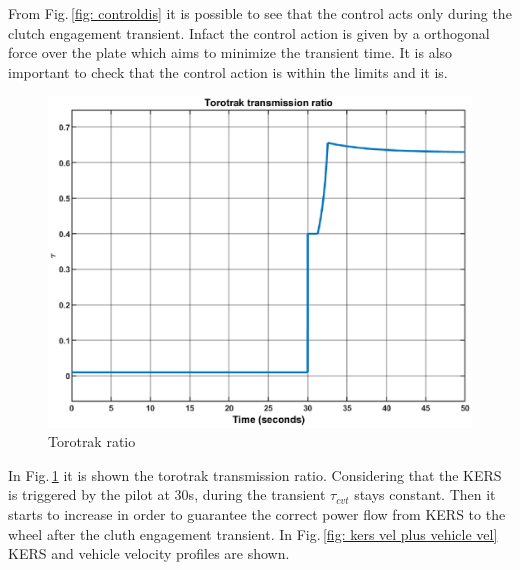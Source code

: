\documentclass[11pt]{article}
\begin{document}
From Fig.\,\ref{fig: controldis} it is possible to see that the control acts only during the clutch engagement transient. Infact the control action is given by a orthogonal force over the plate which aims to minimize the transient time. It is also important to check that the control action is within the limits and it is. 

\begin{figure}[H]
	\centering
	\includegraphics[width=.6\textwidth]{Images/Results_Dynamics/Discharge/Torotrak_ratio.eps}
	\caption{Torotrak ratio}
	\label{fig: tororatiodis}
\end{figure}

In Fig.\,\ref{fig: tororatiodis} it is shown the torotrak transmission ratio. Considering that the KERS is triggered by the pilot at $30$s, during the transient $\tau_{cvt}$ stays constant. Then it starts to increase in order to guarantee the correct power flow from KERS to the wheel after the cluth engagement transient. In Fig.\,\ref{fig: kers vel plus vehicle vel} KERS and vehicle velocity profiles are shown.
 
\end{document}
